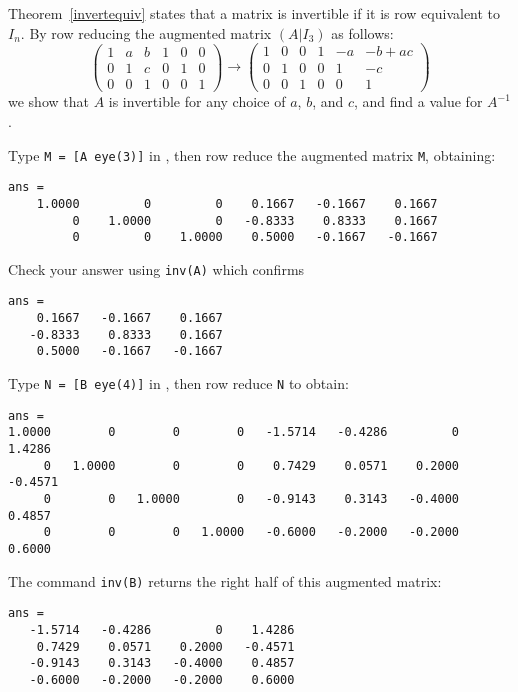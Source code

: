\documentclass{ximera}
\begin{document}
\soln Theorem~\ref{invertequiv} states that a matrix is invertible if
it is row equivalent to $I_n$.  By row reducing the augmented matrix
$(A|I_3)$ as follows:
\[
\left(\begin{array}{rrr|rrr} 1 & a & b & 1 & 0 & 0 \\
0 & 1 & c & 0 & 1 & 0 \\ 0 & 0 & 1 & 0 & 0 & 1
\end{array}\right) \rightarrow \left(\begin{array}{rrr|rrc}
1 & 0 & 0 & 1 & -a & -b + ac \\ 0 & 1 & 0 & 0 & 1 & -c \\
0 & 0 & 1 & 0 & 0 & 1 \end{array}\right)
\]
we show that $A$ is invertible for any choice of $a$, $b$, and
$c$, and find a value for $A^{-1}$.

Type {\tt M = [A eye(3)]} in \Matlabp, then row reduce the augmented 
matrix {\tt M}, obtaining:
\begin{verbatim}
ans =
    1.0000         0         0    0.1667   -0.1667    0.1667
         0    1.0000         0   -0.8333    0.8333    0.1667
         0         0    1.0000    0.5000   -0.1667   -0.1667
\end{verbatim}
Check your answer using {\tt inv(A)} which confirms
\begin{verbatim}
ans =
    0.1667   -0.1667    0.1667
   -0.8333    0.8333    0.1667
    0.5000   -0.1667   -0.1667
\end{verbatim}

Type {\tt N = [B eye(4)]} in \Matlabp, then row reduce {\tt N} to obtain:
\begin{verbatim}
ans =
1.0000        0        0        0   -1.5714   -0.4286         0    1.4286
     0   1.0000        0        0    0.7429    0.0571    0.2000   -0.4571
     0        0   1.0000        0   -0.9143    0.3143   -0.4000    0.4857
     0        0        0   1.0000   -0.6000   -0.2000   -0.2000    0.6000
\end{verbatim}
The command {\tt inv(B)} returns the right half of this augmented
matrix:
\begin{verbatim}
ans =
   -1.5714   -0.4286         0    1.4286
    0.7429    0.0571    0.2000   -0.4571
   -0.9143    0.3143   -0.4000    0.4857
   -0.6000   -0.2000   -0.2000    0.6000
\end{verbatim}
\end{document}
